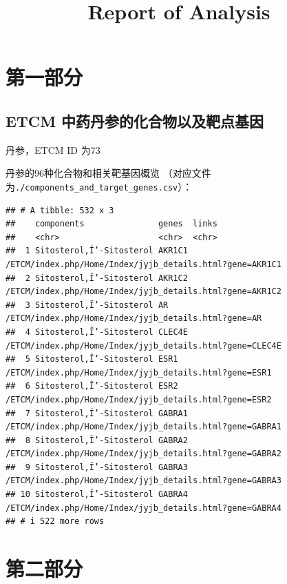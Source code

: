 \documentclass[
]{article}
\title{Report of Analysis}
\author{}
\date{\vspace{-2.5em}}
\begin{document}
\maketitle

{
\setcounter{tocdepth}{3}
\tableofcontents
}
\hypertarget{ux7b2cux4e00ux90e8ux5206}{%
\section{第一部分}\label{ux7b2cux4e00ux90e8ux5206}}

\hypertarget{etcm-ux4e2dux836fux4e39ux53c2ux7684ux5316ux5408ux7269ux4ee5ux53caux9776ux70b9ux57faux56e0}{%
\subsection{ETCM 中药丹参的化合物以及靶点基因}\label{etcm-ux4e2dux836fux4e39ux53c2ux7684ux5316ux5408ux7269ux4ee5ux53caux9776ux70b9ux57faux56e0}}

丹参，ETCM ID 为73

丹参的96种化合物和相关靶基因概览
（对应文件为\texttt{./components\_and\_target\_genes.csv}）：

\begin{verbatim}
## # A tibble: 532 x 3
##    components               genes  links                                                   
##    <chr>                    <chr>  <chr>                                                   
##  1 Sitosterol,Î’-Sitosterol AKR1C1 /ETCM/index.php/Home/Index/jyjb_details.html?gene=AKR1C1
##  2 Sitosterol,Î’-Sitosterol AKR1C2 /ETCM/index.php/Home/Index/jyjb_details.html?gene=AKR1C2
##  3 Sitosterol,Î’-Sitosterol AR     /ETCM/index.php/Home/Index/jyjb_details.html?gene=AR    
##  4 Sitosterol,Î’-Sitosterol CLEC4E /ETCM/index.php/Home/Index/jyjb_details.html?gene=CLEC4E
##  5 Sitosterol,Î’-Sitosterol ESR1   /ETCM/index.php/Home/Index/jyjb_details.html?gene=ESR1  
##  6 Sitosterol,Î’-Sitosterol ESR2   /ETCM/index.php/Home/Index/jyjb_details.html?gene=ESR2  
##  7 Sitosterol,Î’-Sitosterol GABRA1 /ETCM/index.php/Home/Index/jyjb_details.html?gene=GABRA1
##  8 Sitosterol,Î’-Sitosterol GABRA2 /ETCM/index.php/Home/Index/jyjb_details.html?gene=GABRA2
##  9 Sitosterol,Î’-Sitosterol GABRA3 /ETCM/index.php/Home/Index/jyjb_details.html?gene=GABRA3
## 10 Sitosterol,Î’-Sitosterol GABRA4 /ETCM/index.php/Home/Index/jyjb_details.html?gene=GABRA4
## # i 522 more rows
\end{verbatim}

\hypertarget{ux7b2cux4e8cux90e8ux5206}{%
\section{第二部分}\label{ux7b2cux4e8cux90e8ux5206}}
\end{document}
